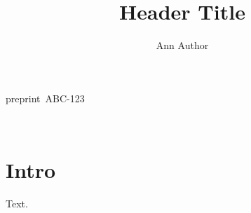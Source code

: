 \documentclass{article}
\title{Header Title}\author{Ann Author}
\begin{document}
\noindent\mbox{preprint ABC-123}
\vspace{1cm}
\begin{center}{\Large\@title}\\[1em]\@author\end{center}
\section{Intro}
Text.
\end{document}
